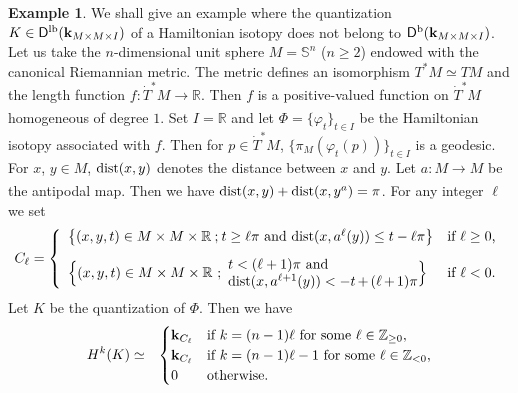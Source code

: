 \documentclass[12pt,leqno]{article}
\theoremstyle{definition}
\newtheorem{example}[theorem]{Example}
\newcommand{\R}{{\mathbb{R}}}
\newcommand{\Z}{{\mathbb{Z}}}
\def\phi{{\varphi}}
\newcommand{\cor}{{\bf k}}
\renewcommand{\to}[1][]{\xrightarrow[]{#1}}
\newcommand{\cl}{\colon}
\newcommand{\ba}{\begin{array}}
\newcommand{\ea}{\end{array}}
\newcommand{\eqn}{\begin{eqnarray*}}
\newcommand{\eneqn}{\end{eqnarray*}}
\newcommand{\set}[2]{\left\{#1 \mathbin{;} #2 \right\}}
\def\dist{{\rm dist}}
\newcommand{\Der}[1][]{\mathsf{D}^{#1}}
\newcommand{\Derb}{\Der[\mathrm{b}]}
\newcommand{\Derlb}{\Der[\mathrm{lb}]}
\newcommand{\dT}{{\dot{T}}}
\numberwithin{equation}{section}
\begin{document}
\begin{example}\label{exam:counter}
We shall give an example where the quantization 
 $K\in \Derlb(\cor_{M\times M\times I})$ of a Hamiltonian isotopy does not belong to
$\Derb(\cor_{M\times M\times I})$.
Let us take the $n$-dimensional unit sphere $M=\mathbb{S}^n$ ($n\ge2$)
endowed  with the canonical Riemannian metric.
The metric defines an isomorphism
$T^*M\simeq TM$ and the length function $f\cl \dT^*M\to\R$.
Then $f$ is a positive-valued function on $\dT^*M$
homogeneous of degree $1$.
Set $I=\R$ and let $\Phi=\{\phi_t\}_{t\in I}$ be the Hamiltonian
isotopy associated with $f$. 
Then for $p\in \dT^*M$, $\{\pi_M(\phi_t(p))\}_{t\in I}$
is a geodesic. For $x$, $y\in M$, $\dist(x,y)$ 
denotes the distance between $x$ and $y$.
Let $a\cl M\to M$ be the antipodal map.
Then we have $\dist(x,y)+\dist(x,y^a)=\pi$.
For any integer $\ell$ we  set
\eqn
C_{\ell}=\left\{
\ba{ll}
\set{(x,y,t)\in M\times M\times \R}%
{\text{$t\ge\ell\pi$ and $\dist(x,a^\ell(y))\le t-\ell\pi$}}
&\text{if $\ell\ge0$,}\\[2ex]
\Bigl\{(x,y,t)\in M\times M\times\R\ ;\
\parbox{31.5ex}%
{$t<(\ell+1)\pi$ and \hfill\\$\dist(x,a^{\ell+1}(y))<-t+(\ell+1)\pi$}\Bigr\}
&\text{if $\ell<0$.}
\ea
\right.
\eneqn
Let $K$ be the quantization of $\Phi$. Then we have
\eqn
H^k(K)&\simeq&
\begin{cases}
\cor_{C_\ell}&\text{if $k=(n-1)\ell$ for some $\ell\in\Z_{\ge0}$,}\\
\cor_{C_\ell}&\text{if $k=(n-1)\ell-1$ for some $\ell\in\Z_{<0}$,}\\
0&\text{otherwise.}
\end{cases}
\eneqn
\end{example}
\end{document}
